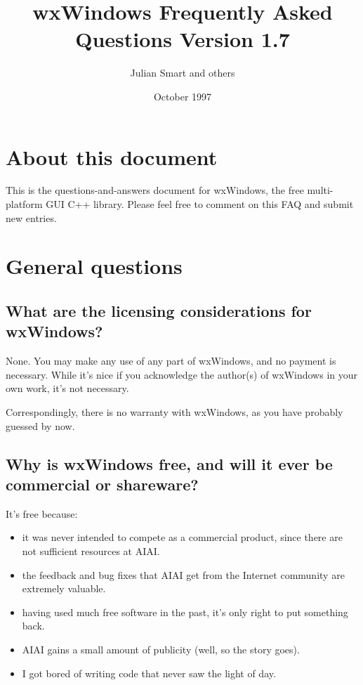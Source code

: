 %

\parskip=10pt
\parindent=0pt
\title{wxWindows Frequently Asked Questions Version 1.7}
\author{Julian Smart and others}
\date{October 1997}
\makeindex

\maketitle
\pagestyle{fancyplain}

\setfooter{\thepage}{}{}{}{}{\thepage}%
\tableofcontents
%
\chapter{About this document}
%
%
\setfooter{\thepage}{}{}{}{}{\thepage}%

This is the questions-and-answers document for wxWindows, the free multi-platform
GUI C++ library. Please feel free to comment on this FAQ and submit new entries.

\chapter{General questions}

\section{What are the licensing considerations for wxWindows?}

None. You may make any use of any part of wxWindows, and no payment is
necessary. While it's nice if you acknowledge the author(s) of wxWindows
in your own work, it's not necessary.

Correspondingly, there is no warranty with wxWindows, as you have probably
guessed by now.

\section{Why is wxWindows free, and will it ever be commercial or shareware?}

It's free because:

\begin{itemize}
\item it was never intended to compete as a commercial product, since
there are not sufficient resources at AIAI.
\item the feedback and bug fixes that AIAI get from the Internet community
are extremely valuable.
\item having used much free software in the past, it's only right
to put something back.
\item AIAI gains a small amount of publicity (well, so the story goes).
\item I got bored of writing code that never saw the light of day.
\end{itemize}

